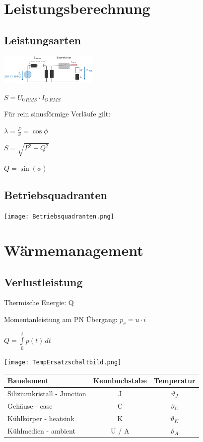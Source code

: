 \documentclass[german]{latex4ei/latex4ei_sheet}
\begin{document}
\section{Leistungsberechnung}
	\begin{sectionbox}
		\subsection{Leistungsarten}
			\begin{bluebox}
				\item \includegraphics[width=180px]{img/Leistungsarten.png}
				\item $S = U_{0\,RMS} \cdot I_{O\,RMS}$
				\item Für rein sinusförmige Verläufe gilt:
				\item $\lambda = \frac{P}{S} = \cos \phi$
				\item $S = \sqrt{P^2+Q^2}$
				\item $Q = \sin(\phi)$
			\end{bluebox}
		\subsection{Betriebsquadranten}
			\begin{symbolbox}
				\item \texttt{[image: Betriebsquadranten.png]}
			\end{symbolbox}
	\end{sectionbox}
\section{Wärmemanagement}
	\begin{sectionbox}
		\subsection{Verlustleistung}
			\begin{bluebox}
				\item Thermische Energie: Q
				\item Momentanleistung am PN Übergang: $p_v = u \cdot i$
				\item $Q = \int\limits_0^t p(t)\,dt$
				\item \texttt{[image: TempErsatzschaltbild.png]}
			\end{bluebox}
			\begin{tabular}{|l|c|c|}
				\textbf{Bauelement}	& \textbf{Kennbuchstabe} & \textbf{Temperatur}\\
				\hline
				Siliziumkristall - Junction & J & $\vartheta_J$\\
				Gehäuse - case & C & $\vartheta_C$\\
				Kühlkörper - heatsink & K & $\vartheta_K$\\
				Kühlmedien - ambient & U / A & $\vartheta_A$
				
			\end{tabular}
	\end{sectionbox}
	\vspace{3cm}
\end{document}

